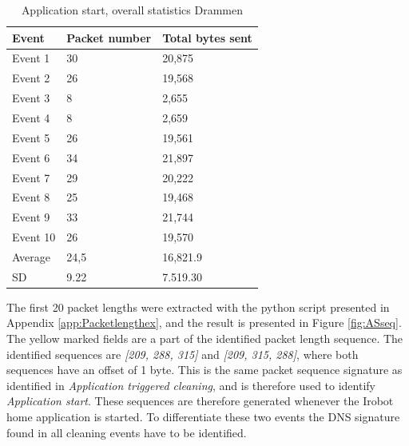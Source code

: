 \begin{table}[H]
\centering
\caption{Application start, overall statistics Drammen}
\label{tab:ASoverallDRA}
\begin{tabular}{|l|l|l|}
\hline
\textbf{Event} & \textbf{Packet number} & \textbf{Total bytes sent} \\ \hline
Event 1        & 30                     & 20,875                     \\ \hline
Event 2        & 26                     & 19,568                     \\ \hline
Event 3        & 8                      & 2,655                      \\ \hline
Event 4        & 8                      & 2,659                      \\ \hline
Event 5        & 26                     & 19,561                     \\ \hline
Event 6        & 34                     & 21,897                     \\ \hline
Event 7        & 29                     & 20,222                     \\ \hline
Event 8        & 25                     & 19,468                     \\ \hline
Event 9        & 33                     & 21,744                     \\ \hline
Event 10       & 26                     & 19,570                     \\ \hline
Average        & 24,5                   & 16,821.9                   \\ \hline
SD       & 9.22
       & 7.519.30               \\ \hline
\end{tabular}
\end{table}

The first 20 packet lengths were extracted with the python script presented in Appendix \ref{app:Packetlengthex}, and the result is presented in Figure \ref{fig:ASseq}. The yellow marked fields are a part of the identified packet length sequence. The identified sequences are \textit{[209, 288, 315]} and \textit{[209, 315, 288]}, where both sequences have an offset of 1 byte. This is the same packet sequence signature as identified in \textit{Application triggered cleaning}, and is therefore used to identify \textit{Application start}. These sequences are therefore generated whenever the Irobot home application is started. To differentiate these two events the \gls{DNS} signature found in all cleaning events have to be identified.  

